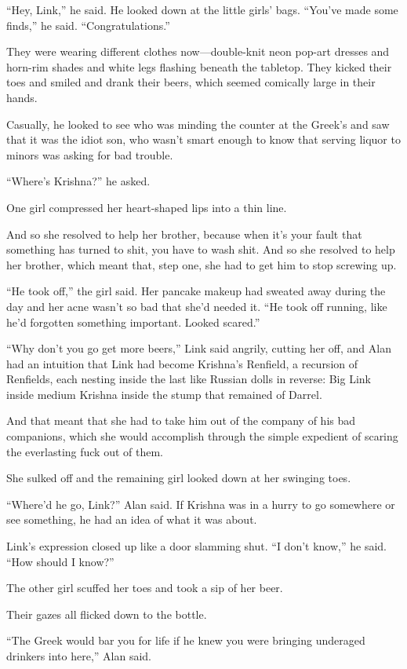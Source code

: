 ``Hey, Link,'' he said.  He looked down at the little girls' bags. 
``You've made some finds,'' he said.  ``Congratulations.''

They were wearing different clothes now---double-knit neon pop-art
dresses and horn-rim shades and white legs flashing beneath the
tabletop.  They kicked their toes and smiled and drank their beers,
which seemed comically large in their hands.

Casually, he looked to see who was minding the counter at the Greek's
and saw that it was the idiot son, who wasn't smart enough to know
that serving liquor to minors was asking for bad trouble.

``Where's Krishna?'' he asked.

One girl compressed her heart-shaped lips into a thin line.

And so she resolved to help her brother, because when it's your fault
that something has turned to shit, you have to wash shit.  And so she
resolved to help her brother, which meant that, step one, she had to
get him to stop screwing up.

``He took off,'' the girl said.  Her pancake makeup had sweated away
during the day and her acne wasn't so bad that she'd needed it.  ``He
took off running, like he'd forgotten something important.  Looked
scared.''

``Why don't you go get more beers,'' Link said angrily, cutting her
off, and Alan had an intuition that Link had become Krishna's
Renfield, a recursion of Renfields, each nesting inside the last like
Russian dolls in reverse:  Big Link inside medium Krishna inside the
stump that remained of Darrel.

And that meant that she had to take him out of the company of his bad
companions, which she would accomplish through the simple expedient of
scaring the everlasting fuck out of them.

She sulked off and the remaining girl looked down at her swinging
toes.

``Where'd he go, Link?'' Alan said.  If Krishna was in a hurry to go
somewhere or see something, he had an idea of what it was about.

Link's expression closed up like a door slamming shut.  ``I don't
know,'' he said.  ``How should I know?''

The other girl scuffed her toes and took a sip of her beer.

Their gazes all flicked down to the bottle.

``The Greek would bar you for life if he knew you were bringing
underaged drinkers into here,'' Alan said.

